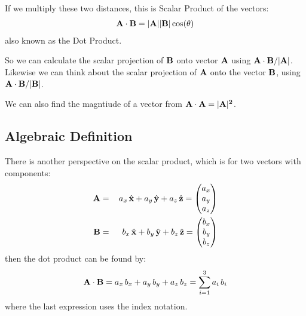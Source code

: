 \documentclass[letterpaper,10pt,english]{jupyterBook}
\begin{document}
\sphinxAtStartPar
If we multiply these two distances, this is Scalar Product of the vectors:
\begin{equation*}
\begin{split}{\bf A \cdot B} = |{\bf A}||{\bf B}|\cos(\theta)\end{split}
\end{equation*}
\sphinxAtStartPar
also known as the Dot Product.

\sphinxAtStartPar
So we can calculate the scalar projection of \(\bf B\) onto vector \(\bf A\) using \({\bf A \cdot B} / |{\bf A}|\).  Likewise we can think about the scalar projection of \(\bf A\) onto the vector
\(\bf B\), using \({\bf A \cdot B} / |{\bf B}|\).

\sphinxAtStartPar
We can also find the magntiude of a vector from \(\bf A \cdot A = |A|^2 \).


\subsection{Algebraic Definition}
\label{\detokenize{VectorCalculus/vectoralgebra:algebraic-definition}}
\sphinxAtStartPar
There is another perspective on the scalar product, which is for two vectors with components:
\begin{equation*}
\begin{split}{\bf A} &=&\, a_x\,\hat{\bf x} + a_y\,\hat{\bf y} + a_z\,\hat{\bf z} = \begin{pmatrix}
 a_x \\
 a_y \\
 a_z 
\end{pmatrix} \\
{\bf B} &=&\, b_x\,\hat{\bf x} + b_y\,\hat{\bf y} + b_z\,\hat{\bf z} = \begin{pmatrix}
 b_x \\
 b_y \\
 b_z 
\end{pmatrix}\end{split}
\end{equation*}
\sphinxAtStartPar
then the dot product can be found by:
\begin{equation*}
\begin{split}{\bf A \cdot B} = a_x\,b_x + a_y\,b_y + a_z\,b_z= \sum_{i=1}^3 a_i\,b_i\end{split}
\end{equation*}
\sphinxAtStartPar
where the last expression uses the index notation.
\end{document}
